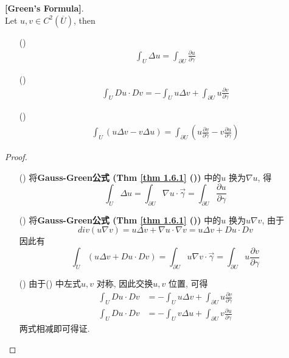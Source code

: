 	\begin{corollary}\label{cor 1.6.3}
		\textbf{[Green's Formula]}. \\
		Let $u , v \in C^{2}(\overline{U})$, then
		\begin{enumerate}
			\item[(\rmnum{1})]
			\begin{align}
				\int_{U} \Delta u = \int_{\partial U} \frac{\partial u}{\partial \gamma}
			\end{align}
		
			\item[(\rmnum{2})]
			\begin{align}
				\int_{U} Du \cdot Dv = -\int_{U} u \Delta v + \int_{\partial U} u \frac{\partial v}{\partial \gamma}
			\end{align}
		
			\item[(\rmnum{3})]
			\begin{align}
				\int_{U} (u \Delta v - v \Delta u) = \int_{\partial U} \left( u \frac{\partial v}{\partial \gamma} - v \frac{\partial u}{\partial \gamma} \right)
			\end{align}
		\end{enumerate}
		
		\vspace{6em}
		
		\begin{proof}
			\begin{enumerate}
				\item[(\rmnum{1})] 将\textbf{Gauss-Green公式 (Thm \ref{thm 1.6.1} ())} 中的$u$ 换为$\nabla u$, 得
				\[ \int_{U} \Delta u = \int_{\partial U} \nabla u \cdot \vec{\gamma} = \int_{\partial U} \frac{\partial u}{\partial \gamma} \]
				
				\vspace{2em}
				
				\item[(\rmnum{2})] 将\textbf{Gauss-Green公式 (Thm \ref{thm 1.6.1} ())} 中的$u$ 换为$u \nabla v$, 由于
				\[ div(u \nabla v) = u \Delta v + \nabla u \cdot \nabla v = u \Delta v + Du \cdot Dv \]
				因此有
				\[ \int_{U} (u \Delta v + Du \cdot Dv) 
				= \int_{\partial U} u \nabla v \cdot \vec{\gamma} 
				= \int_{\partial U} u \frac{\partial v}{\partial \gamma} \]
				
				\vspace{2em}
				
				\item[(\rmnum{3})] 由于() 中左式$u , v$ 对称, 因此交换$u , v$ 位置, 可得
				\begin{align}
					\int_{U} Du \cdot Dv &= -\int_{U} u \Delta v + \int_{\partial U} u \frac{\partial v}{\partial \gamma} \\
					\int_{U} Du \cdot Dv &= -\int_{U} v \Delta u + \int_{\partial U} v \frac{\partial u}{\partial \gamma}
				\end{align}
				两式相减即可得证.
			\end{enumerate}
		\end{proof}
	\end{corollary}

